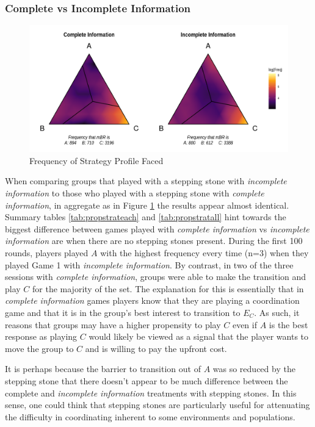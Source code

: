 \subsubsection*{Complete vs Incomplete Information}

\begin{figure}[h]
\captionsetup{justification=centering}
  \caption{Frequency of Strategy Profile Faced}
   \label{fig:GamesCIFreqPlot}
    \includegraphics[width = \textwidth]{Images/GamesCIFreqPlot.png}
\end{figure}

When comparing groups that played with a stepping stone with \textit{incomplete information} to those who played with a stepping stone with \textit{complete information}, in aggregate as in Figure \ref{fig:GamesCIFreqPlot} the results appear almost identical. Summary tables \ref{tab:propstrateach} and \ref{tab:propstratall} hint towards the biggest difference between games played with \textit{complete information} vs \textit{incomplete information} are when there are no stepping stones present. During the first 100 rounds, players played $A$ with the highest frequency every time (n=3) when they played Game 1 with \textit{incomplete information}. By contrast, in two of the three sessions with \textit{complete information}, groups were able to make the transition and play $C$ for the majority of the set. The explanation for this is essentially that in \textit{complete information} games players know that they are playing a coordination game and that it is in the group's best interest to transition to $E_C$. As such, it reasons that groups may have a higher propensity to play $C$ even if $A$ is the best response as playing $C$ would likely be viewed as a signal that the player wants to move the group to $C$ and is willing to pay the upfront cost. 

It is perhaps because the barrier to transition out of $A$ was so reduced by the stepping stone that there doesn't appear to be much difference between the complete and \textit{incomplete information} treatments with stepping stones. In this sense, one could think that stepping stones are particularly useful for attenuating the difficulty in coordinating inherent to some environments and populations. 

